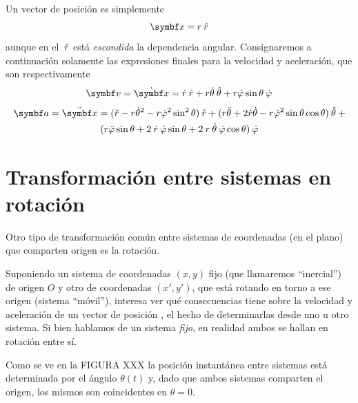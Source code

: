 \documentclass[10pt,oneside]{CBFT_book}
\begin{document}
Un vector de posición es simplemente
\[
	\vb{x} = r \rver
\]
aunque en el $\:\hat{r}$ está {\it escondida} la dependencia angular. Consignaremos a continuación solamente las 
expresiones finales para la velocidad y aceleración, que son respectivamente
\[
	\vb{v} = \dot{\vb{x}} = \dot{r} \rver + r\dot{\theta}\thetaver + r\dot{\vp}\sin\theta\phiver
\]
\begin{multline*} %
	\!\: \vb{a} = \ddot{\vb{x}} = ( \ddot{r} - r\dot{\theta}^2 - r\dot{\vp}^2 \sin^2 \theta )\rver +
	( r\ddot{\theta} + 2\dot{r}\dot{\theta} - r\dot{\vp}^2 \sin \theta \cos\theta )\thetaver \: + \\
	( r \ddot{\vp}\sin\theta + 2 \: \dot{r} \: \dot{\vp} \sin\theta + 2 \: r \:\dot{\theta} \:\dot{\vp} \cos\theta )\phiver 
\end{multline*}
	

\section{Transformación entre sistemas en rotación}

Otro tipo de transformación común entre sistemas de coordenadas (en el plano) que comparten origen es la rotación.

Suponiendo un sistema de coordenadas $(x,y)$ fijo (que llamaremos ``inercial'') de origen $O$ y otro de coordenadas 
$(x',y')$, que está rotando en torno a ese origen (sistema ``móvil''), interesa ver qué consecuencias tiene sobre la 
velocidad y aceleración de un vector de posición , el hecho de determinarlas desde uno u otro sistema. Si bien 
hablamos de un sistema {\it fijo}, en realidad ambos se hallan en rotación entre sí. 

Como se ve en la FIGURA XXX 
la posición instantánea entre sistemas está determinada por el ángulo $\theta(t)$ y, dado que ambos sistemas comparten 
el origen, los mismos son coincidentes en $\theta = 0$. 
\end{document}
